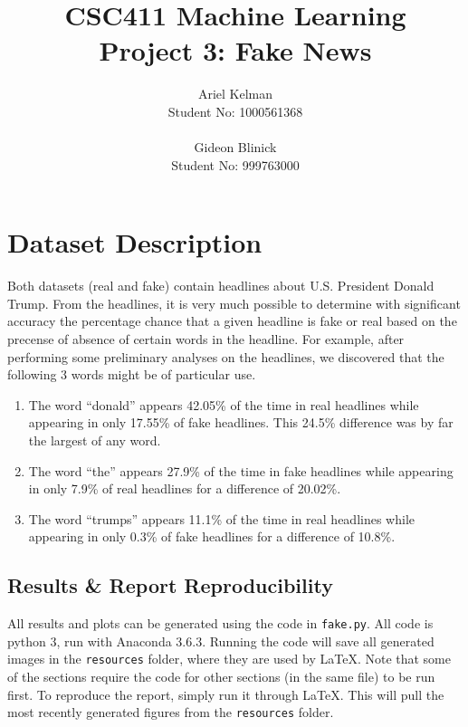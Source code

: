 \documentclass{article}
\title{CSC411 Machine Learning \\ Project 3: Fake News}
\author{ Ariel Kelman \\ Student No: 1000561368
         \\ \\
         Gideon Blinick \\ Student No: 999763000 }
\begin{document}
   \maketitle{}


   \section{Dataset Description}

   Both datasets (real and fake) contain headlines about U.S. President Donald Trump.
   From the headlines, it is very much possible to determine with significant accuracy
   the percentage chance that a given headline is fake or real based on the precense of
   absence of certain words in the headline. For example, after performing some preliminary
   analyses on the headlines, we discovered that the following 3 words might be of particular use.
   \begin{enumerate}
      \item The word ``donald'' appears 42.05\% of the time in real headlines while appearing in only
            17.55\% of fake headlines. This 24.5\% difference was by far the largest of any word.
      \item The word ``the'' appears 27.9\% of the time in fake headlines while appearing in only
            7.9\% of real headlines for a difference of 20.02\%.
      \item The word ``trumps'' appears 11.1\% of the time in real headlines while appearing in
            only 0.3\% of fake headlines for a difference of 10.8\%.
   \end{enumerate}



   \subsection{Results \& Report Reproducibility}
   All results and plots can be generated using the code in \texttt{fake.py}.
   All code is python 3, run with Anaconda 3.6.3.
   Running the code will save all generated images in the \texttt{resources} folder,
   where they are used by \LaTeX. Note that some of the sections require the code for
   other sections (in the same file) to be run first.
   To reproduce the report, simply run it through \LaTeX. This will pull the most recently
   generated figures from the \texttt{resources} folder.
\end{document}
